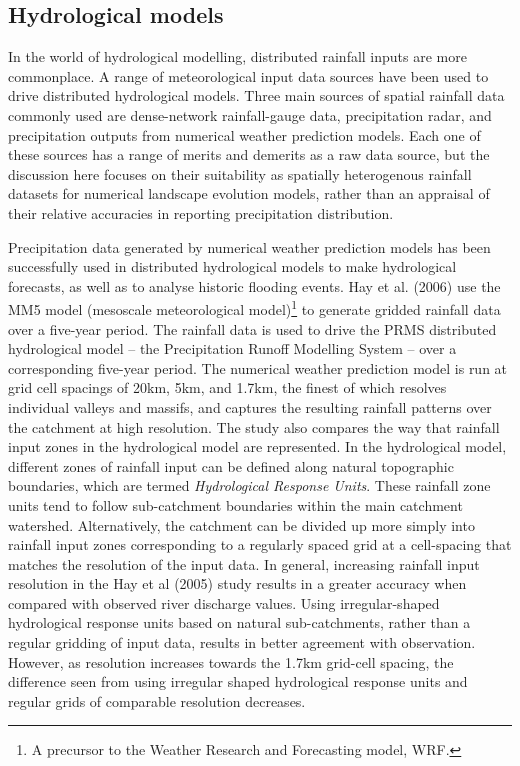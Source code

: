\documentclass[12pt,oneside,PhD]{muthesis}
\begin{document}
\subsection{Hydrological models}
In the world of hydrological modelling, distributed rainfall inputs are more commonplace. A range of meteorological input data sources have been used to drive distributed hydrological models. Three main sources of spatial rainfall data commonly used are dense-network rainfall-gauge data, precipitation radar, and precipitation outputs from numerical weather prediction models. Each one of these sources has a range of merits and demerits as a raw data source, but the discussion here focuses on their suitability as spatially heterogenous rainfall datasets for numerical landscape evolution models, rather than an appraisal of their relative accuracies in reporting precipitation distribution.

Precipitation data generated by numerical weather prediction models has been successfully used in distributed hydrological models to make hydrological forecasts, as well as to analyse historic flooding events. Hay et al. (2006) use the MM5 model (mesoscale meteorological model)\footnote{A precursor to the Weather Research and Forecasting model, WRF.} to generate gridded rainfall data over a five-year period.  The rainfall data is used to drive the PRMS distributed hydrological model -- the Precipitation Runoff Modelling System -- over a corresponding five-year period. The numerical weather prediction model is run at grid cell spacings of 20km, 5km, and 1.7km, the finest of which resolves individual valleys and massifs, and captures the resulting rainfall patterns over the catchment at high resolution. The study also compares the way that rainfall input zones in the hydrological model are represented. In the hydrological model, different zones of rainfall input can be defined along natural topographic boundaries, which are termed \textit{Hydrological Response Units}. These rainfall zone units tend to follow sub-catchment boundaries within the main catchment watershed. Alternatively, the catchment can be divided up more simply into rainfall input zones corresponding to a regularly spaced grid at a cell-spacing that matches the resolution of the input data.
In general, increasing rainfall input resolution in the Hay et al (2005) study results in a greater accuracy when compared with observed river discharge values. Using irregular-shaped hydrological response units based on natural sub-catchments, rather than a regular gridding of input data, results in better agreement with observation. However, as resolution increases towards the 1.7km grid-cell spacing, the difference seen from using irregular shaped hydrological response units and regular grids of comparable resolution decreases. 
\end{document}
